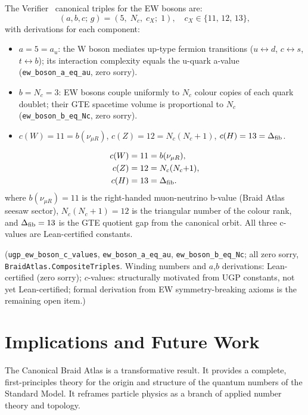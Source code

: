 \documentclass[11pt]{article}
\theoremstyle{remark}
\begin{document}
The Verifier~\cite{Spivack2026_SM_UGP} canonical triples for the EW bosons are:
\begin{equation}
  (a, b, c;\,g) = (5,\;N_c,\;c_X;\;1), \quad c_X \in \{11,\,12,\,13\},
\end{equation}
with derivations for each component:
\begin{itemize}[leftmargin=1.5em]
  \item $a = 5 = a_u$: the W boson mediates up-type fermion transitions ($u\leftrightarrow d$, $c\leftrightarrow s$, $t\leftrightarrow b$); its interaction complexity equals the u-quark a-value (\texttt{ew\_boson\_a\_eq\_au}, zero sorry).
  \item $b = N_c = 3$: EW bosons couple uniformly to $N_c$ colour copies of each quark doublet; their GTE spacetime volume is proportional to $N_c$ (\texttt{ew\_boson\_b\_eq\_Nc}, zero sorry).
  \item $c(W) = 11 = b(\nu_{\mu R})$, $c(Z) = 12 = N_c(N_c{+}1)$, $c(H) = 13 = \Delta_{\rm fib}$.
\end{itemize}
\begin{align*}
  c(W) &= 11 = b(\nu_{\mu R}), \\
  c(Z) &= 12 = N_c(N_c{+}1), \\
  c(H) &= 13 = \Delta_{\rm fib}.
\end{align*}
where $b(\nu_{\mu R}) = 11$ is the right-handed muon-neutrino b-value (Braid Atlas
seesaw sector), $N_c(N_c+1) = 12$ is the triangular number of the colour rank,
and $\Delta_{\rm fib} = 13$ is the GTE quotient gap from the canonical orbit.
All three c-values are Lean-certified constants.

(\texttt{ugp\_ew\_boson\_c\_values}, \texttt{ew\_boson\_a\_eq\_au}, \texttt{ew\_boson\_b\_eq\_Nc};
all zero sorry, \texttt{BraidAtlas.CompositeTriples}.
Winding numbers and $a$,$b$ derivations: Lean-certified (zero sorry);
$c$-values: structurally motivated from UGP constants, not yet Lean-certified;
formal derivation from EW symmetry-breaking axioms is the remaining open item.)

\section{Implications and Future Work}
\label{sec:implications}

The Canonical Braid Atlas is a transformative result. It provides a complete, first-principles theory for the origin and structure of the quantum numbers of the Standard Model. It reframes particle physics as a branch of applied number theory and topology.
\end{document}

